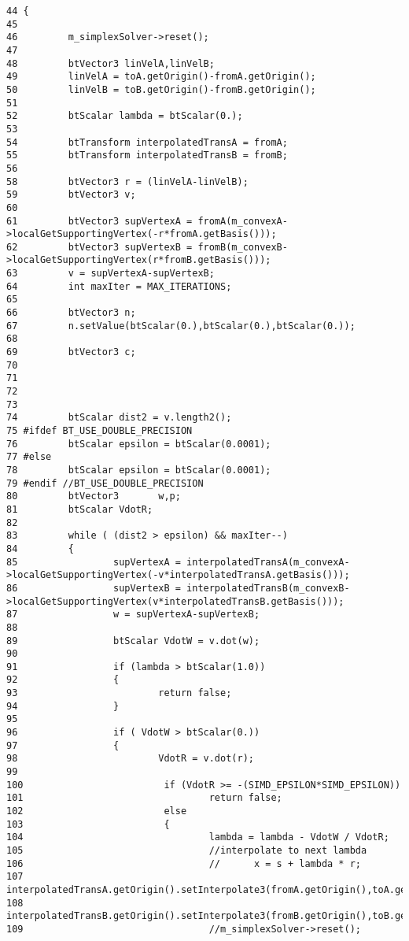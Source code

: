 \begin{Code}\begin{verbatim}44 {
45 
46         m_simplexSolver->reset();
47 
48         btVector3 linVelA,linVelB;
49         linVelA = toA.getOrigin()-fromA.getOrigin();
50         linVelB = toB.getOrigin()-fromB.getOrigin();
51 
52         btScalar lambda = btScalar(0.);
53 
54         btTransform interpolatedTransA = fromA;
55         btTransform interpolatedTransB = fromB;
56 
58         btVector3 r = (linVelA-linVelB);
59         btVector3 v;
60         
61         btVector3 supVertexA = fromA(m_convexA->localGetSupportingVertex(-r*fromA.getBasis()));
62         btVector3 supVertexB = fromB(m_convexB->localGetSupportingVertex(r*fromB.getBasis()));
63         v = supVertexA-supVertexB;
64         int maxIter = MAX_ITERATIONS;
65 
66         btVector3 n;
67         n.setValue(btScalar(0.),btScalar(0.),btScalar(0.));
68         
69         btVector3 c;
70 
71         
72 
73 
74         btScalar dist2 = v.length2();
75 #ifdef BT_USE_DOUBLE_PRECISION
76         btScalar epsilon = btScalar(0.0001);
77 #else
78         btScalar epsilon = btScalar(0.0001);
79 #endif //BT_USE_DOUBLE_PRECISION
80         btVector3       w,p;
81         btScalar VdotR;
82         
83         while ( (dist2 > epsilon) && maxIter--)
84         {
85                 supVertexA = interpolatedTransA(m_convexA->localGetSupportingVertex(-v*interpolatedTransA.getBasis()));
86                 supVertexB = interpolatedTransB(m_convexB->localGetSupportingVertex(v*interpolatedTransB.getBasis()));
87                 w = supVertexA-supVertexB;
88 
89                 btScalar VdotW = v.dot(w);
90 
91                 if (lambda > btScalar(1.0))
92                 {
93                         return false;
94                 }
95 
96                 if ( VdotW > btScalar(0.))
97                 {
98                         VdotR = v.dot(r);
99 
100                         if (VdotR >= -(SIMD_EPSILON*SIMD_EPSILON))
101                                 return false;
102                         else
103                         {
104                                 lambda = lambda - VdotW / VdotR;
105                                 //interpolate to next lambda
106                                 //      x = s + lambda * r;
107                                 interpolatedTransA.getOrigin().setInterpolate3(fromA.getOrigin(),toA.getOrigin(),lambda);
108                                 interpolatedTransB.getOrigin().setInterpolate3(fromB.getOrigin(),toB.getOrigin(),lambda);
109                                 //m_simplexSolver->reset();

\end{verbatim}
\end{Code}
